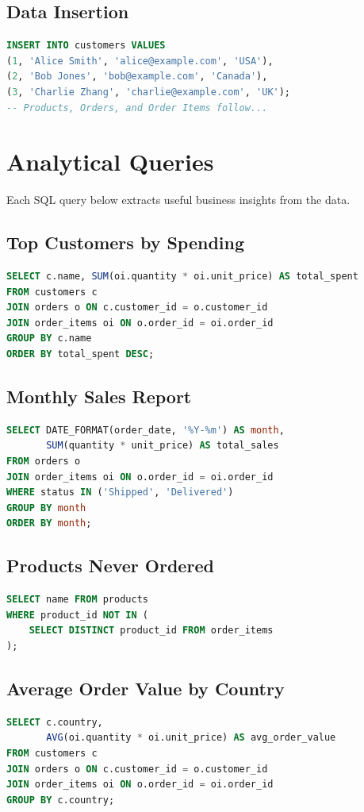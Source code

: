 \documentclass[12pt]{article}
\begin{document}
\subsection{Data Insertion}
\begin{lstlisting}[language=SQL, caption=Sample Data Insert]
INSERT INTO customers VALUES
(1, 'Alice Smith', 'alice@example.com', 'USA'),
(2, 'Bob Jones', 'bob@example.com', 'Canada'),
(3, 'Charlie Zhang', 'charlie@example.com', 'UK');
-- Products, Orders, and Order Items follow...
\end{lstlisting}

\section{Analytical Queries}
Each SQL query below extracts useful business insights from the data.

\subsection{Top Customers by Spending}
\begin{lstlisting}[language=SQL]
SELECT c.name, SUM(oi.quantity * oi.unit_price) AS total_spent
FROM customers c
JOIN orders o ON c.customer_id = o.customer_id
JOIN order_items oi ON o.order_id = oi.order_id
GROUP BY c.name
ORDER BY total_spent DESC;
\end{lstlisting}

\subsection{Monthly Sales Report}
\begin{lstlisting}[language=SQL]
SELECT DATE_FORMAT(order_date, '%Y-%m') AS month,
       SUM(quantity * unit_price) AS total_sales
FROM orders o
JOIN order_items oi ON o.order_id = oi.order_id
WHERE status IN ('Shipped', 'Delivered')
GROUP BY month
ORDER BY month;
\end{lstlisting}

\subsection{Products Never Ordered}
\begin{lstlisting}[language=SQL]
SELECT name FROM products
WHERE product_id NOT IN (
    SELECT DISTINCT product_id FROM order_items
);
\end{lstlisting}

\subsection{Average Order Value by Country}
\begin{lstlisting}[language=SQL]
SELECT c.country, 
       AVG(oi.quantity * oi.unit_price) AS avg_order_value
FROM customers c
JOIN orders o ON c.customer_id = o.customer_id
JOIN order_items oi ON o.order_id = oi.order_id
GROUP BY c.country;
\end{lstlisting}
\end{document}
